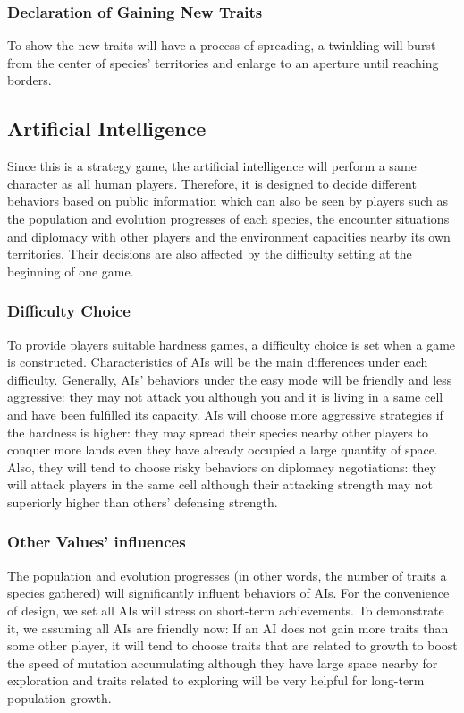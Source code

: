 \subsubsection{Declaration of Gaining New Traits}
To show the new traits will have a process of spreading, a twinkling will burst from the center of species' territories and enlarge to an aperture until reaching borders.

\subsection{Artificial Intelligence}
Since this is a strategy game, the artificial intelligence will perform a same character as all human players. Therefore, it is designed to decide different behaviors based on public information which can also be seen by players such as the population and evolution progresses of each species, the encounter situations and diplomacy with other players and the environment capacities nearby its own territories. Their decisions are also affected by the difficulty setting at the beginning of one game.

\subsubsection{Difficulty Choice}
To provide players suitable hardness games, a difficulty choice is set when a game is constructed. Characteristics of AIs will be the main differences under each difficulty. Generally, AIs' behaviors under the easy mode will be friendly and less aggressive: they may not attack you although you and it is living in a same cell and have been fulfilled its capacity. AIs will choose more aggressive strategies if the hardness is higher: they may spread their species nearby other players to conquer more lands even they have already occupied a large quantity of space. Also, they will tend to choose risky behaviors on diplomacy negotiations: they will attack players in the same cell although their attacking strength may not superiorly higher than others' defensing strength.

\subsubsection{Other Values' influences}
The population and evolution progresses (in other words, the number of traits a species gathered) will significantly influent behaviors of AIs. For the convenience of design, we set all AIs will stress on short-term achievements. To demonstrate it, we assuming all AIs are friendly now: If an AI does not gain more traits than some other player, it will tend to choose traits that are related to growth to boost the speed of mutation accumulating although they have large space nearby for exploration and traits related to exploring will be very helpful for long-term population growth. 

